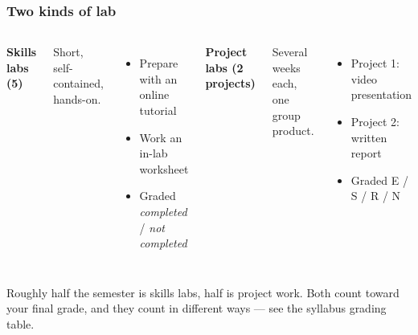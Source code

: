\documentclass[slidestop,compress,mathserif]{beamer}
\begin{document}
\begin{frame}
\frametitle{Two kinds of lab}

\begin{columns}[T]
\textbf{\color{ccBlue} Skills labs (5)}

\vspace{0.3em}
Short, self-contained, hands-on.

\begin{itemize}\footnotesize
\item Prepare with an online tutorial
\item Work an in-lab worksheet
\item Graded \emph{completed} / \emph{not completed}
\end{itemize}

\textbf{\color{ccTerra} Project labs (2 projects)}

\vspace{0.3em}
Several weeks each, one group product.

\begin{itemize}\footnotesize
\item Project 1: video presentation
\item Project 2: written report
\item Graded E / S / R / N
\end{itemize}
\end{columns}

\vspace{0.8em}
Roughly half the semester is skills labs, half is project work. Both
count toward your final grade, and they count in different ways --- see
the syllabus grading table.

\end{frame}
\end{document}
